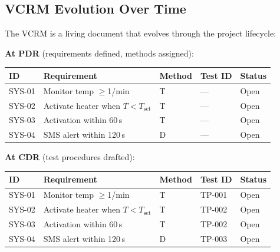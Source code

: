 \documentclass[11pt,letterpaper,twoside,openany]{book}
\begin{document}
\subsection{VCRM Evolution Over Time}
The VCRM is a living document that evolves through the project lifecycle:

\begin{keyconceptbox}
\textbf{At PDR} (requirements defined, methods assigned):
\begin{center}\small
\begin{tabularx}{\textwidth}{l X l l l}
\toprule
\textbf{ID} & \textbf{Requirement} & \textbf{Method} & \textbf{Test ID} & \textbf{Status} \\
\midrule
SYS-01 & Monitor temp $\geq$1/min & T & --- & Open \\
SYS-02 & Activate heater when $T < T_{\text{set}}$ & T & --- & Open \\
SYS-03 & Activation within 60\,s & T & --- & Open \\
SYS-04 & SMS alert within 120\,s & D & --- & Open \\
\bottomrule
\end{tabularx}
\end{center}

\textbf{At CDR} (test procedures drafted):
\begin{center}\small
\begin{tabularx}{\textwidth}{l X l l l}
\toprule
\textbf{ID} & \textbf{Requirement} & \textbf{Method} & \textbf{Test ID} & \textbf{Status} \\
\midrule
SYS-01 & Monitor temp $\geq$1/min & T & TP-001 & Open \\
SYS-02 & Activate heater when $T < T_{\text{set}}$ & T & TP-002 & Open \\
SYS-03 & Activation within 60\,s & T & TP-002 & Open \\
SYS-04 & SMS alert within 120\,s & D & TP-003 & Open \\
\bottomrule
\end{tabularx}
\end{center}


\end{keyconceptbox}
\end{document}
